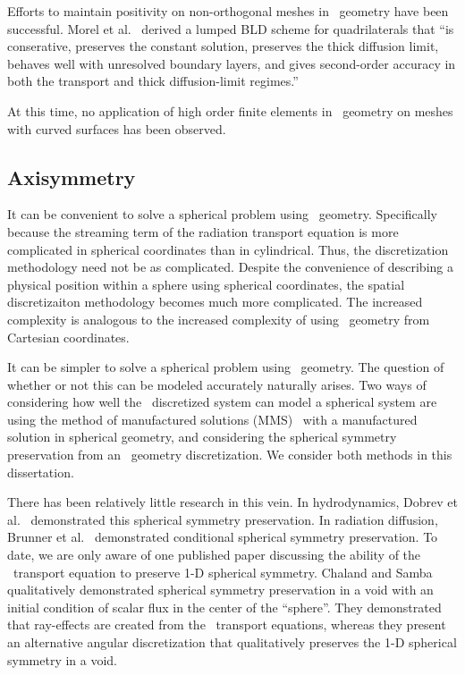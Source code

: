 \documentclass{article}
\begin{document}
Efforts to maintain positivity on non-orthogonal meshes in \RZ\ geometry have been successful. Morel et al.~\cite{MorelLBLD} derived a lumped BLD scheme for quadrilaterals that ``is conserative, preserves the constant solution, preserves the thick diffusion limit, behaves well with unresolved boundary layers, and gives second-order accuracy in both the transport and thick diffusion-limit regimes.''

At this time, no application of high order finite elements in \RZ\ geometry on meshes with curved surfaces has been observed.

\subsection{Axisymmetry}
It can be convenient to solve a spherical problem using \RZ\ geometry. Specifically because the streaming term of the radiation transport equation is more complicated in spherical coordinates than in cylindrical. Thus, the discretization methodology need not be as complicated. Despite the convenience of describing a physical position within a sphere using spherical coordinates, the spatial discretizaiton methodology becomes much more complicated. The increased complexity is analogous to the increased complexity of using \RZ\ geometry from Cartesian coordinates.

It can be simpler to solve a spherical problem using \RZ\ geometry. The question of whether or not this can be modeled accurately naturally arises. Two ways of considering how well the \RZ\ discretized system can model a spherical system are using the method of manufactured solutions (MMS)~\cite{Lingus} with a manufactured solution in spherical geometry, and considering the spherical symmetry preservation from an \RZ\ geometry discretization. We consider both methods in this dissertation.

There has been relatively little research in this vein. In hydrodynamics, Dobrev et al.~\cite{DobrevHOAxisymmetric} demonstrated this spherical symmetry preservation. In radiation diffusion, Brunner et al.~\cite{BrunnerSphericalsymmetry} demonstrated conditional spherical symmetry preservation. To date, we are only aware of one published paper discussing the ability of the \RZ\ transport equation to preserve 1-D spherical symmetry. Chaland and Samba~\cite{Chaland2016SphericalSymmetry} qualitatively demonstrated spherical symmetry preservation in a void with an initial condition of scalar flux in the center of the ``sphere''. They demonstrated that ray-effects are created from the \SN\ transport equations, whereas they present an alternative angular discretization that qualitatively preserves the 1-D spherical symmetry in a void.
\end{document}
